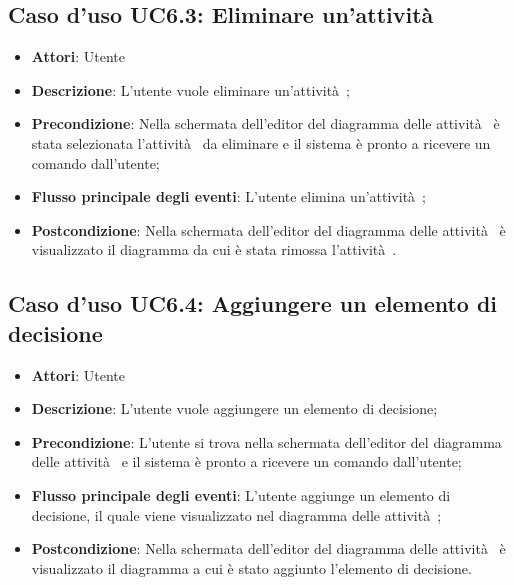 \documentclass[../AnalisiDeiRequisiti.tex]{subfiles}
\begin{document}
				\subsection{Caso d'uso UC6.3: Eliminare un'attività }
				\begin{itemize}
					\item \textbf{Attori}: Utente
					\item \textbf{Descrizione}: L'utente vuole eliminare un'attività ;
					\item \textbf{Precondizione}: Nella schermata dell'editor del diagramma delle attività  è stata selezionata l'attività  da eliminare e il sistema è pronto a ricevere un comando dall'utente;
					\item \textbf{Flusso principale degli eventi}: L'utente elimina un'attività ;
					\item \textbf{Postcondizione}: Nella schermata dell'editor del diagramma delle attività  è visualizzato il diagramma da cui è stata rimossa l'attività .
				\end{itemize}
				\subsection{Caso d'uso UC6.4: Aggiungere un elemento di decisione}
				\begin{itemize}
					\item \textbf{Attori}: Utente
					\item \textbf{Descrizione}: L'utente vuole aggiungere un elemento di decisione;
					\item \textbf{Precondizione}: L'utente si trova nella schermata dell'editor del diagramma delle attività  e il sistema è pronto a ricevere un comando dall'utente;
					\item \textbf{Flusso principale degli eventi}: L'utente aggiunge un elemento di decisione, il quale viene visualizzato nel diagramma delle attività ;
					\item \textbf{Postcondizione}: Nella schermata dell'editor del diagramma delle attività  è visualizzato il diagramma a cui è stato aggiunto l'elemento di decisione.
				\end{itemize}
\end{document}
